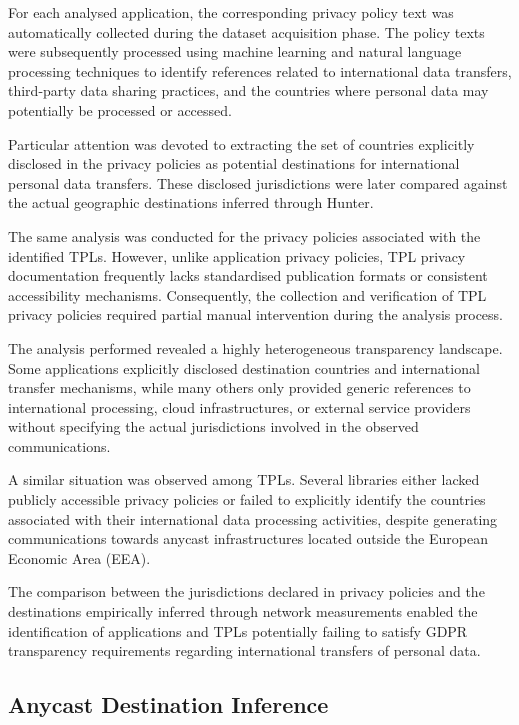 For each analysed application, the corresponding privacy policy text was automatically collected during the dataset acquisition phase. The policy texts were subsequently processed using machine learning and natural language processing techniques to identify references related to international data transfers, third-party data sharing practices, and the countries where personal data may potentially be processed or accessed.

Particular attention was devoted to extracting the set of countries explicitly disclosed in the privacy policies as potential destinations for international personal data transfers. These disclosed jurisdictions were later compared against the actual geographic destinations inferred through Hunter.

The same analysis was conducted for the privacy policies associated with the identified TPLs. However, unlike application privacy policies, TPL privacy documentation frequently lacks standardised publication formats or consistent accessibility mechanisms. Consequently, the collection and verification of TPL privacy policies required partial manual intervention during the analysis process.

The analysis performed revealed a highly heterogeneous transparency landscape. Some applications explicitly disclosed destination countries and international transfer mechanisms, while many others only provided generic references to international processing, cloud infrastructures, or external service providers without specifying the actual jurisdictions involved in the observed communications.

A similar situation was observed among TPLs. Several libraries either lacked publicly accessible privacy policies or failed to explicitly identify the countries associated with their international data processing activities, despite generating communications towards anycast infrastructures located outside the European Economic Area (EEA).

The comparison between the jurisdictions declared in privacy policies and the destinations empirically inferred through network measurements enabled the identification of applications and TPLs potentially failing to satisfy GDPR transparency requirements regarding international transfers of personal data.

\subsection{Anycast Destination Inference}
\label{sc:anycast_experiments_hunter_integration}

